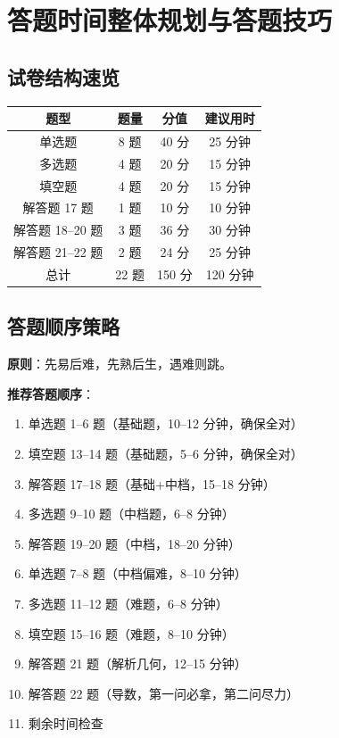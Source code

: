 \section{答题时间整体规划与答题技巧}

\subsection{试卷结构速览}

\begin{center}
\begin{tabular}{c|c|c|c}
题型 & 题量 & 分值 & 建议用时 \\ \hline
单选题 & 8 题 & 40 分 & 25 分钟 \\
多选题 & 4 题 & 20 分 & 15 分钟 \\
填空题 & 4 题 & 20 分 & 15 分钟 \\
解答题 17 题 & 1 题 & 10 分 & 10 分钟 \\
解答题 18--20 题 & 3 题 & 36 分 & 30 分钟 \\
解答题 21--22 题 & 2 题 & 24 分 & 25 分钟 \\
\hline
总计 & 22 题 & 150 分 & 120 分钟
\end{tabular}
\end{center}

\subsection{答题顺序策略}

\textbf{原则}：先易后难，先熟后生，遇难则跳。

\textbf{推荐答题顺序}：
\begin{enumerate}
  \item 单选题 1--6 题（基础题，10--12 分钟，确保全对）
  \item 填空题 13--14 题（基础题，5--6 分钟，确保全对）
  \item 解答题 17--18 题（基础+中档，15--18 分钟）
  \item 多选题 9--10 题（中档题，6--8 分钟）
  \item 解答题 19--20 题（中档，18--20 分钟）
  \item 单选题 7--8 题（中档偏难，8--10 分钟）
  \item 多选题 11--12 题（难题，6--8 分钟）
  \item 填空题 15--16 题（难题，8--10 分钟）
  \item 解答题 21 题（解析几何，12--15 分钟）
  \item 解答题 22 题（导数，第一问必拿，第二问尽力）
  \item 剩余时间检查
\end{enumerate}

